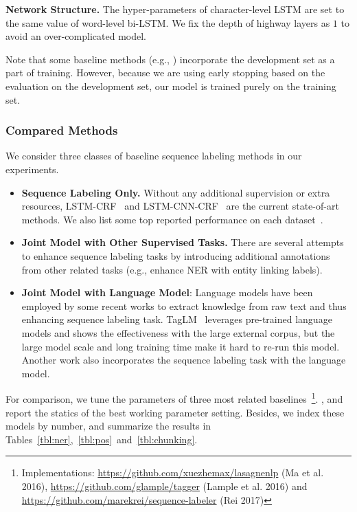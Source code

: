 \documentclass[letterpaper]{article} %
\begin{document}
\noindent\textbf{Network Structure.} The hyper-parameters of character-level LSTM are set to the same value of word-level bi-LSTM.
We fix the depth of highway layers as $1$ to avoid an over-complicated model.

Note that some baseline methods (e.g., \cite{Chiu2016NamedER,peters2017semi}) incorporate the development set as a part of training. However, because we are using early stopping based on the evaluation on the development set, our model is trained purely on the training set. 

\subsubsection{Compared Methods}
We consider three classes of baseline sequence labeling methods in our experiments.
\begin{itemize}[noitemsep,nolistsep]
    \item \textbf{Sequence Labeling Only.}
    Without any additional supervision or extra resources, LSTM-CRF~\cite{2016naacl} and LSTM-CNN-CRF~\cite{ma-hovy:2016:P16-1} are the current state-of-art methods.
    We also list some top reported performance on each dataset~\cite{Collobert2011NaturalLP,luo2015joint,Chiu2016NamedER,yang2017transfer,peters2017semi,manning2011part,sogaard2016deep,sun2014structure}.

    \item \textbf{Joint Model with Other Supervised Tasks.}
    There are several attempts~\cite{luo2015joint,yang2017transfer} to enhance sequence labeling tasks by introducing additional annotations from other related tasks (e.g., enhance NER with entity linking labels). 

    \item \textbf{Joint Model with Language Model}:
    Language models have been employed by some recent works to extract knowledge from raw text and thus enhancing sequence labeling task. 
    TagLM~\cite{peters2017semi} leverages pre-trained language models and shows the effectiveness with the large external corpus, 
    but the large model scale and long training time make it hard to re-run this model.
    Another work \cite{rei2017semi} also incorporates the sequence labeling task with the language model.

\end{itemize}
For comparison, we tune the parameters of three most related baselines~\cite{ma-hovy:2016:P16-1,2016naacl,rei2017semi}\footnote{Implementations: \url{https://github.com/xuezhemax/lasagnenlp} (Ma et al. 2016), \url{https://github.com/glample/tagger} (Lample et al. 2016) and \url{https://github.com/marekrei/sequence-labeler} (Rei 2017)}.
    , and report the statics of the best working parameter setting.
Besides, we index these models by number, and summarize the results in Tables~\ref{tbl:ner},~\ref{tbl:pos}~and~\ref{tbl:chunking}.
\end{document}
